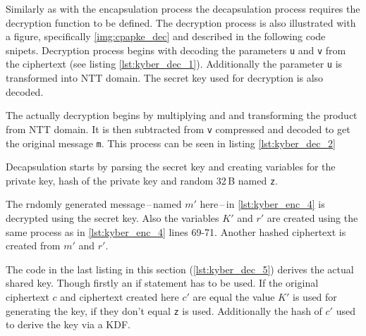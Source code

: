 Similarly as with the encapsulation process the decapsulation process requires the decryption function to be defined. The decryption process is also illustrated with a figure, specifically \ref{img:cpapke_dec} and described in the following code snipets. Decryption process begins with decoding the parameters \texttt{u} and \texttt{v} from the ciphertext (see listing \ref{lst:kyber_dec_1}). Additionally the parameter \texttt{u} is transformed into NTT domain. The secret key used for decryption is also decoded.

The actually decryption begins by multiplying  and  and transforming the product from NTT domain. It is then subtracted from \texttt{v} compressed and decoded to get the original message \texttt{m}. This process can be seen in listing \ref{lst:kyber_dec_2}


Decapsulation starts by parsing the secret key and creating variables for the private key, hash of the private key and random 32\,B named \texttt{z}.

The rndomly generated message\,--\,named $m'$ here\,--\,in \ref{lst:kyber_enc_4} is decrypted using the secret key. Also the variables $K'$ and $r'$ are created using the same process as in \ref{lst:kyber_enc_4} lines 69-71. Another hashed ciphertext is created from $m'$ and $r'$.

The code in the last listing in this section (\ref{lst:kyber_dec_5}) derives the actual shared key. Though firstly an if statement has to be used. If the original ciphertext $c$ and ciphertext created here $c'$ are equal the value $K'$ is used for generating the key, if they don't equal \texttt{z} is used. Additionally the hash of $c'$ used to derive the key via a KDF.
